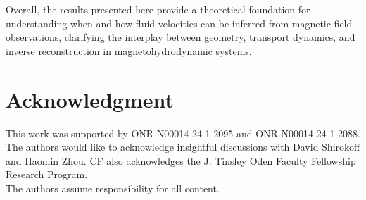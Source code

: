 \documentclass[12pt]{article}
\begin{document}
Overall, the results presented here provide a theoretical foundation for understanding when and how fluid velocities can be inferred from magnetic field observations, clarifying the interplay between geometry, transport dynamics, and inverse reconstruction in magnetohydrodynamic systems.
		
		\section*{Acknowledgment}
		
		This work was supported by ONR N00014-24-1-2095 and ONR N00014-24-1-2088. The authors would like to acknowledge insightful discussions with David Shirokoff and Haomin Zhou.
        CF also acknowledges the J. Tinsley Oden Faculty Fellowship Research Program.\\

       The authors assume responsibility for all content.
		
	
		
		
		

\appendix


    
\end{document}
